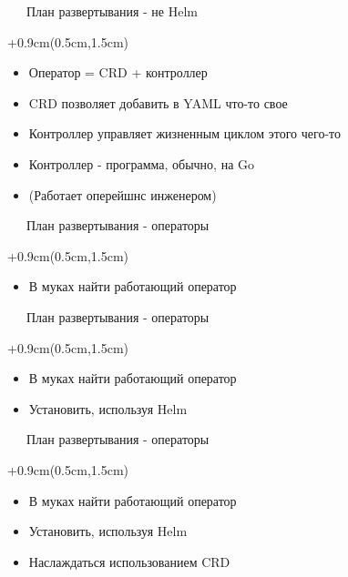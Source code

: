 \documentclass[xetex,18pt,aspectratio=43]{beamer}
\begin{document}
\begin{Large}
\begin{frame}{\ \ \ План развертывания - не Helm}
\begin{textblock*}{\framewidth+0.9cm}(0.5cm,1.5cm)
\begin{itemize}
  \item Оператор = CRD + контроллер
  \item CRD позволяет добавить в YAML что-то свое
  \item Контроллер управляет жизненным циклом этого чего-то
  \item Контроллер - программа, обычно, на Go
  \item (Работает оперейшнс инженером)
\end{itemize}
\end{textblock*}
\end{frame}

\begin{frame}{\ \ \ План развертывания - операторы}
\begin{textblock*}{\framewidth+0.9cm}(0.5cm,1.5cm)
\begin{itemize}
  \item В муках найти работающий оператор
\end{itemize}
\end{textblock*}
\end{frame}

\begin{frame}{\ \ \ План развертывания - операторы}
\begin{textblock*}{\framewidth+0.9cm}(0.5cm,1.5cm)
\begin{itemize}
  \item В муках найти работающий оператор
  \item Установить, используя Helm
\end{itemize}
\end{textblock*}
\end{frame}

\begin{frame}{\ \ \ План развертывания - операторы}
\begin{textblock*}{\framewidth+0.9cm}(0.5cm,1.5cm)
\begin{itemize}
  \item В муках найти работающий оператор
  \item Установить, используя Helm
  \item Наслаждаться использованием CRD
\end{itemize}
\end{textblock*}
\end{frame}


\end{Large}
\end{document}
